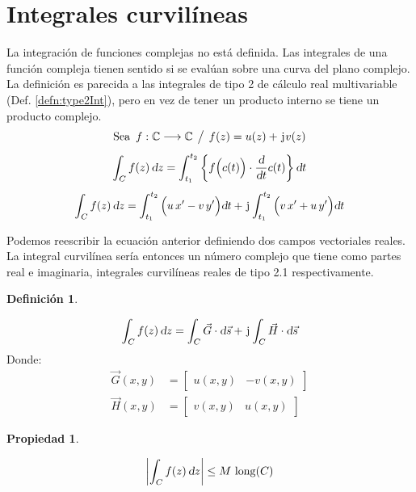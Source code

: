 \documentclass[a5paper,12pt,twoside]{book}
\newtheorem{defn}{{Definición}}[chapter]
\newtheorem{prop}{{Propiedad}}[chapter]
\begin{document}
\section{Integrales curvilíneas}

La integración de funciones complejas no está definida.
Las integrales de una función compleja tienen sentido si se evalúan sobre una curva del plano complejo.
La definición es parecida a las integrales de tipo 2 de cálculo real multivariable (Def. \ref{defn:type2Int}), pero en vez de tener un producto interno se tiene un producto complejo.
\begin{gather*}
    \textrm{Sea} \enspace f: \setC \longrightarrow \setC \tq f(z) = u(z) + \iu v(z)
    \\[1ex]
    \int_{C} f(z) \, \dif z = \int_{t_1}^{t_2} \left\{ f \Big( c(t) \Big) \cdot \frac{\dif}{\dif t} c(t) \right\} \dif t
    \\[1ex]
    \scale{0.98}{
    \int_{C} f(z) \, \dif z = \int_{t_1}^{t_2} \Big( u \, x' - v \, y' \Big) \dif t + \iu \int_{t_1}^{t_2} \Big( v \, x' + u \, y' \Big) \dif t
    }
\end{gather*}

Podemos reescribir la ecuación anterior definiendo dos campos vectoriales reales.
La integral curvilínea sería entonces un número complejo que tiene como partes real e imaginaria, integrales curvilíneas reales de tipo 2.1 respectivamente.

\begin{mdframed}[style=DefinitionFrame]
    \begin{defn}
        \label{defn:integral}
    \end{defn}
    \begin{equation*}
        \int_{C} f(z) \, \textsl{d} z = \int_{C} \Vec{G} \cdot \textsl{d} \Vec{s} + \mkern2mu\mathrm{j}\mkern1mu \int_{C} \Vec{H} \cdot \textsl{d} \Vec{s}
    \end{equation*}
    Donde:
    \begin{align*}
        \Vec{G}(x,y) &= \begin{bmatrix} u(x,y) & -v(x,y) \end{bmatrix}
        \\
        \Vec{H}(x,y) &= \begin{bmatrix} v(x,y) & u(x,y) \end{bmatrix}
    \end{align*}
\end{mdframed}

\begin{mdframed}[style=PropertyFrame]
    \begin{prop}
    \end{prop}
    \begin{equation*}
        {\left| {\int_C f(z) \, \textsl{d}z} \right|} \leq M \, \operatorname{long}(C)
    \end{equation*}
\end{mdframed}
\end{document}
